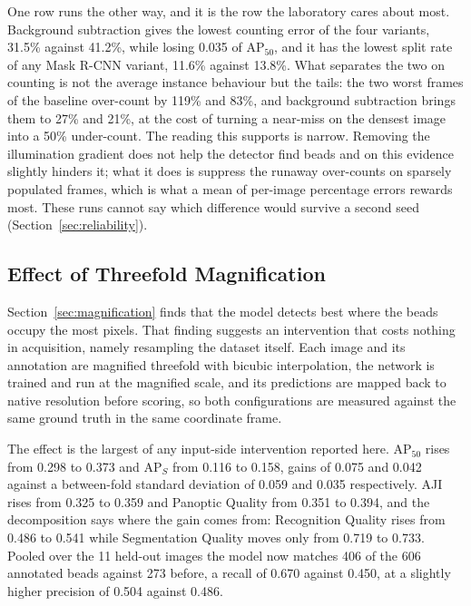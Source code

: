 One row runs the other way, and it is the row the laboratory cares about most.
Background subtraction gives the lowest counting error of the four variants,
31.5\% against 41.2\%, while losing 0.035 of $\mathrm{AP}_{50}$, and it has the
lowest split rate of any Mask R-CNN variant, 11.6\% against 13.8\%. What separates
the two on counting is not the average instance behaviour but the tails: the two
worst frames of the baseline over-count by 119\% and 83\%, and background
subtraction brings them to 27\% and 21\%, at the cost of turning a near-miss on
the densest image into a 50\% under-count. The reading this supports is
narrow. Removing the illumination gradient does not help the detector find beads
and on this evidence slightly hinders it; what it does is suppress the runaway
over-counts on sparsely populated frames, which is what a mean of per-image
percentage errors rewards most. These runs cannot say which difference would
survive a second seed (Section~\ref{sec:reliability}).

\subsection{Effect of Threefold Magnification}
\label{sec:upsample_results}

Section~\ref{sec:magnification} finds that the model detects best where the beads
occupy the most pixels. That finding suggests an intervention that costs nothing in
acquisition, namely resampling the dataset itself. Each image and its
annotation are magnified threefold with bicubic interpolation, the network is
trained and run at the magnified scale, and its predictions are mapped back to
native resolution before scoring, so both configurations are measured against
the same ground truth in the same coordinate frame.


The effect is the largest of any input-side intervention reported here.
$\mathrm{AP}_{50}$ rises from 0.298 to 0.373 and $\mathrm{AP}_S$ from 0.116 to
0.158, gains of 0.075 and 0.042 against a between-fold standard deviation of 0.059
and 0.035 respectively. AJI rises from 0.325 to 0.359 and Panoptic Quality from
0.351 to 0.394, and the decomposition says where the gain comes from: Recognition
Quality rises from 0.486 to 0.541 while Segmentation Quality moves only from 0.719
to 0.733. Pooled over the 11 held-out images the model now matches 406 of the
606 annotated beads against 273 before, a recall of 0.670 against 0.450, at a
slightly higher precision of 0.504 against 0.486.

